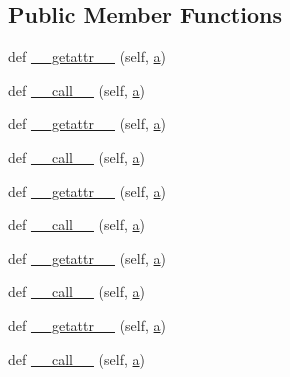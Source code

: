 \subsection*{Public Member Functions}
\begin{DoxyCompactItemize}
\item 
def \hyperlink{classwaflib_1_1_logs_1_1color__dict_a45d2e7e0bee051479c7d4c1078fa2e41}{\+\_\+\+\_\+getattr\+\_\+\+\_\+} (self, \hyperlink{rfft2d_test_m_l_8m_a4124bc0a9335c27f086f24ba207a4912}{a})
\item 
def \hyperlink{classwaflib_1_1_logs_1_1color__dict_ab351fe8adb3dd7942506b662c2236cd6}{\+\_\+\+\_\+call\+\_\+\+\_\+} (self, \hyperlink{rfft2d_test_m_l_8m_a4124bc0a9335c27f086f24ba207a4912}{a})
\item 
def \hyperlink{classwaflib_1_1_logs_1_1color__dict_a45d2e7e0bee051479c7d4c1078fa2e41}{\+\_\+\+\_\+getattr\+\_\+\+\_\+} (self, \hyperlink{rfft2d_test_m_l_8m_a4124bc0a9335c27f086f24ba207a4912}{a})
\item 
def \hyperlink{classwaflib_1_1_logs_1_1color__dict_ab351fe8adb3dd7942506b662c2236cd6}{\+\_\+\+\_\+call\+\_\+\+\_\+} (self, \hyperlink{rfft2d_test_m_l_8m_a4124bc0a9335c27f086f24ba207a4912}{a})
\item 
def \hyperlink{classwaflib_1_1_logs_1_1color__dict_a45d2e7e0bee051479c7d4c1078fa2e41}{\+\_\+\+\_\+getattr\+\_\+\+\_\+} (self, \hyperlink{rfft2d_test_m_l_8m_a4124bc0a9335c27f086f24ba207a4912}{a})
\item 
def \hyperlink{classwaflib_1_1_logs_1_1color__dict_ab351fe8adb3dd7942506b662c2236cd6}{\+\_\+\+\_\+call\+\_\+\+\_\+} (self, \hyperlink{rfft2d_test_m_l_8m_a4124bc0a9335c27f086f24ba207a4912}{a})
\item 
def \hyperlink{classwaflib_1_1_logs_1_1color__dict_a45d2e7e0bee051479c7d4c1078fa2e41}{\+\_\+\+\_\+getattr\+\_\+\+\_\+} (self, \hyperlink{rfft2d_test_m_l_8m_a4124bc0a9335c27f086f24ba207a4912}{a})
\item 
def \hyperlink{classwaflib_1_1_logs_1_1color__dict_ab351fe8adb3dd7942506b662c2236cd6}{\+\_\+\+\_\+call\+\_\+\+\_\+} (self, \hyperlink{rfft2d_test_m_l_8m_a4124bc0a9335c27f086f24ba207a4912}{a})
\item 
def \hyperlink{classwaflib_1_1_logs_1_1color__dict_a45d2e7e0bee051479c7d4c1078fa2e41}{\+\_\+\+\_\+getattr\+\_\+\+\_\+} (self, \hyperlink{rfft2d_test_m_l_8m_a4124bc0a9335c27f086f24ba207a4912}{a})
\item 
def \hyperlink{classwaflib_1_1_logs_1_1color__dict_ab351fe8adb3dd7942506b662c2236cd6}{\+\_\+\+\_\+call\+\_\+\+\_\+} (self, \hyperlink{rfft2d_test_m_l_8m_a4124bc0a9335c27f086f24ba207a4912}{a})

\end{DoxyCompactItemize}
